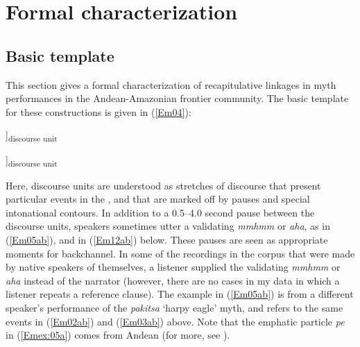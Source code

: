 \documentclass[output=paper]{LSP/langsci}
\begin{document}
\section{Formal characterization}
\label{Emformal}
\subsection{Basic template}
\label{Embasic}
This section gives a formal characterization of recapitulative linkages in  myth performances in the Andean-Amazonian frontier community. The basic template for these constructions is given in (\ref{Em04}):

\begin{exe}
\ex \label{Em04}
\glt [...[\underline{Reference clause}]]\textsubscript{discourse unit}


\glt[[\textbf{Bridging clause}] [Discourse-new information]]\textsubscript{discourse unit}\\
\end{exe}

Here, discourse units are understood as stretches of discourse that present particular events in the , and that are marked off by pauses and special intonational contours. In addition to a 0.5--4.0 second pause between the discourse units, speakers sometimes utter a validating \textit{mmhmm} or \textit{aha}, as in (\ref{Em05ab}), and in (\ref{Em12ab}) below. These pauses are seen as appropriate moments for backchannel. In some of the recordings in the corpus that were made by native speakers of  themselves, a listener supplied the validating \textit{mmhmm} or \textit{aha} instead of the narrator (however, there are no cases in my data in which a listener repeats a reference clause). The example in (\ref{Em05ab}) is from a different speaker’s performance of the \textit{pakitsa} `harpy eagle' myth, and refers to the same events in (\ref{Em02ab}) and (\ref{Em03ab}) above. Note that the emphatic particle \textit{pe} in (\ref{Emex:05a}) comes from Andean  (for more, see ).
\end{document}
